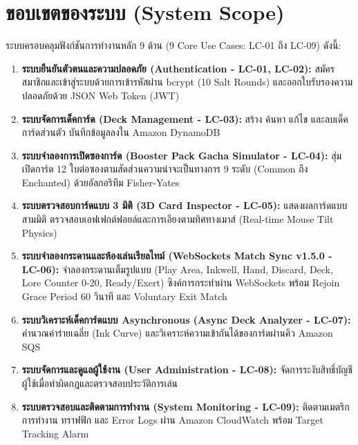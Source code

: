 \documentclass[12pt,a4paper]{report}
\begin{document}
\section{ขอบเขตของระบบ (System Scope)}
ระบบครอบคลุมฟังก์ชันการทำงานหลัก 9 ด้าน (9 Core Use Cases: LC-01 ถึง LC-09) ดังนี้:
\begin{enumerate}
    \item \textbf{ระบบยืนยันตัวตนและความปลอดภัย (Authentication - LC-01, LC-02):} สมัครสมาชิกและเข้าสู่ระบบด้วยการเข้ารหัสผ่าน bcrypt (10 Salt Rounds) และออกใบรับรองความปลอดภัยด้วย JSON Web Token (JWT)
    \item \textbf{ระบบจัดการเด็คการ์ด (Deck Management - LC-03):} สร้าง ค้นหา แก้ไข และลบเด็คการ์ดส่วนตัว บันทึกข้อมูลลงใน Amazon DynamoDB
    \item \textbf{ระบบจำลองการเปิดซองการ์ด (Booster Pack Gacha Simulator - LC-04):} สุ่มเปิดการ์ด 12 ใบต่อซองตามสัดส่วนความน่าจะเป็นทางการ 9 ระดับ (Common ถึง Enchanted) ด้วยอัลกอริทึม Fisher-Yates
    \item \textbf{ระบบตรวจสอบการ์ดแบบ 3 มิติ (3D Card Inspector - LC-05):} แสดงผลการ์ดแบบสามมิติ ตรวจสอบเอฟเฟกต์ฟอยล์และการเอียงตามทิศทางเมาส์ (Real-time Mouse Tilt Physics)
    \item \textbf{ระบบจำลองกระดานและห้องเล่นเรียลไทม์ (WebSockets Match Sync v1.5.0 - LC-06):} จำลองกระดานเต็มรูปแบบ (Play Area, Inkwell, Hand, Discard, Deck, Lore Counter 0-20, Ready/Exert) ซิงค์การกระทำผ่าน WebSockets พร้อม Rejoin Grace Period 60 วินาที และ Voluntary Exit Match
    \item \textbf{ระบบวิเคราะห์เด็คการ์ดแบบ Asynchronous (Async Deck Analyzer - LC-07):} คำนวณค่าร่ายเฉลี่ย (Ink Curve) และวิเคราะห์ความเข้ากันได้ของการ์ดผ่านคิว Amazon SQS
    \item \textbf{ระบบจัดการและดูแลผู้ใช้งาน (User Administration - LC-08):} จัดการระงับสิทธิ์บัญชีผู้ใช้เมื่อทำผิดกฎและตรวจสอบประวัติการเล่น
    \item \textbf{ระบบตรวจสอบและติดตามการทำงาน (System Monitoring - LC-09):} ติดตามเมตริกการทำงาน ทราฟฟิก และ Error Logs ผ่าน Amazon CloudWatch พร้อม Target Tracking Alarm
\end{enumerate}
\end{document}
